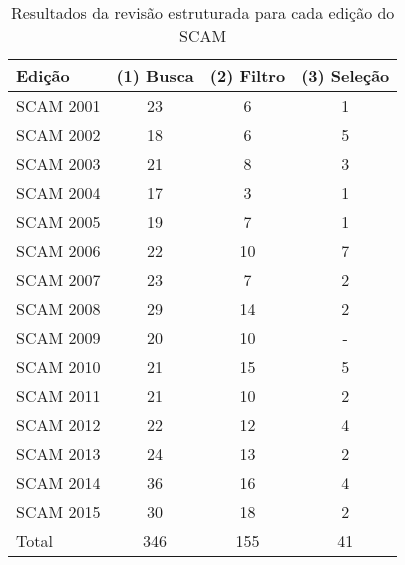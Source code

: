 \begin{table}[h]
\caption{Resultados da revisão estruturada para cada edição do SCAM}
\centering
\begin{tabular}{| l | c | c | c |}
  \hline
  Edição & (1) Busca & (2) Filtro & (3) Seleção \\
  \hline
  SCAM 2001 & 23    & 6         & 1           \\
  SCAM 2002 & 18    & 6         & 5           \\
  SCAM 2003 & 21    & 8         & 3           \\
  SCAM 2004 & 17    & 3         & 1           \\
  SCAM 2005 & 19    & 7         & 1           \\
  SCAM 2006 & 22    & 10        & 7           \\
  SCAM 2007 & 23    & 7         & 2           \\
  SCAM 2008 & 29    & 14        & 2           \\
  SCAM 2009 & 20    & 10        & -           \\
  SCAM 2010 & 21    & 15        & 5           \\
  SCAM 2011 & 21    & 10        & 2           \\
  SCAM 2012 & 22    & 12        & 4           \\
  SCAM 2013 & 24    & 13        & 2           \\
  SCAM 2014 & 36    & 16        & 4           \\
  SCAM 2015 & 30    & 18        & 2           \\
  \hline
  Total     & 346   & 155       & 41          \\
  \hline
\end{tabular}
\label{artigos-do-scam}
\end{table}

